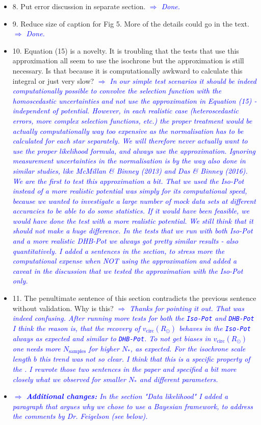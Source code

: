 \documentclass[10pt,a4paper]{article}
\newcommand{\Comment}[1]{\textsl{\textcolor{Blue}{$\Longrightarrow$ {#1}}}}
\begin{document}
\begin{itemize}
\item 8. Put error discussion in separate section. \Comment{Done.}
\item 9. Reduce size of caption for Fig 5. More of the details could go in the text. \Comment{Done.}
\item 10. Equation (15) is a novelty. It is troubling that the tests that use this approximation all seem to use the isochrone but the approximation is still necessary. Is that because it is computationally awkward to calculate this integral or just very slow? \Comment{In our simple test scenarios it should be indeed computationally possible to convolve the selection function with the homoscedastic uncertainties and not use the approximation in Equation (15) - independent of potential. However, in each realistic case (heteroscedastic errors, more complex selection functions, etc.) the proper treatment would be actually computationally way too expensive as the normalisation has to be calculated for each star separately. We will therefore never actually want to use the proper likelihood formula, and always use the approximation. Ignoring measurement uncertainties in the normalisation is by the way also done in similar studies, like McMillan \& Binney (2013) and Das \& Binney (2016). We are the first to test this approximation a bit. That we used the Iso-Pot instead of a more realistic potential was simply for its computational speed, because we wanted to investigate a large number of mock data sets at different accuracies to be able to do some statistics. If it would have been feasible, we would have done the test with a more realistic potential. We still think that it should not make a huge difference. In the tests that we run with both Iso-Pot and a more realistic DHB-Pot we always got pretty similar results - also quantitatively. I added a sentences in the section, to stress more the computational expense when NOT using the approximation and added a caveat in the discussion that we tested the approximation with the Iso-Pot only.}
\item 11. The penultimate sentence of this section contradicts the previous sentence without validation. Why is this? \Comment{Thanks for pointing it out. That was indeed confusing. After running more tests for both the \texttt{Iso-Pot} and \texttt{DHB-Pot} I think the reason is, that the recovery of $v_\text{circ}(R_\odot)$ behaves in the \texttt{Iso-Pot} always as expected and similar to \texttt{DHB-Pot}. To not get biases in $v_\text{circ}(R_\odot)$ one needs more $N_\text{samples}$ for higher $N_*$, as expected. For the isochrone scale length $b$ this trend was not so clear. I think that this is a specific property of the \text{Iso-Pot}. I rewrote those two sentences in the paper and specified a bit more closely what we observed for smaller $N_*$ and different parameters.}
\item \Comment{\textbf{Additional changes:} In the section "Data likelihood" I added a paragraph that argues why we chose to use a Bayesian framework, to address the comments by Dr. Feigelson (see below).}
\end{itemize}
\end{document}
